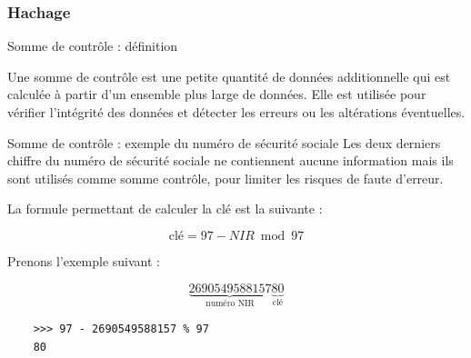 \subsubsection{Hachage}
\begin{frame}{Somme de contrôle : définition}
  \begin{definition}
    Une somme de contrôle est une petite quantité de données additionnelle qui est calculée à partir d'un ensemble plus large de données. Elle est utilisée pour vérifier l'intégrité des données et détecter les erreurs ou les altérations éventuelles.
  \end{definition}
\end{frame}

\begin{frame}[fragile]{Somme de contrôle : exemple du numéro de sécurité sociale}
  Les deux derniers chiffre du numéro de sécurité sociale ne contiennent aucune information mais ils sont utilisés comme somme contrôle, pour limiter les risques de faute d'erreur.

  La formule permettant de calculer la clé est la suivante :

  $$
    \textrm{clé} = 97 - NIR \bmod 97
  $$

  Prenons l'exemple suivant :

  $$
    \underbrace{2 69 05 49 588 157}_{\textrm{numéro NIR}}\underbrace{80}_{\textrm{clé}}
  $$

  \begin{verbatim}
    >>> 97 - 2690549588157 % 97
    80
  \end{verbatim}
\end{frame}

